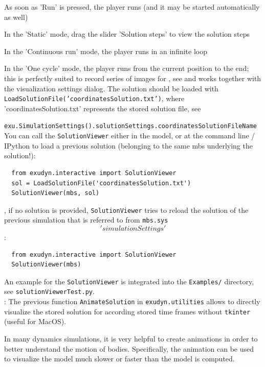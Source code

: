 \item As soon as 'Run' is pressed, the player runs (and it may be started automatically as well)
\item In the 'Static' mode, drag the slider 'Solution steps' to view the solution steps
\item In the 'Continuous run' mode, the player runs in an infinite loop
\item In the 'One cycle' mode, the player runs from the current position to the end; this is perfectly suited to record series of images for , see  and works together with the visualization settings dialog.
\ei
The solution should be loaded with
\texttt{LoadSolutionFile('coordinatesSolution.txt')}, where 'coordinatesSolution.txt' represents the stored solution file, 
see 
\bi
  \item \texttt{exu.SimulationSettings().solutionSettings.coordinatesSolutionFileName}
\ei
You can call the \texttt{SolutionViewer} either in the model, or at the command line / IPython to load a previous solution (belonging to the same mbs underlying the solution!):
\pythonstyle\begin{lstlisting}
  from exudyn.interactive import SolutionViewer
  sol = LoadSolutionFile('coordinatesSolution.txt')
  SolutionViewer(mbs, sol)
\end{lstlisting}
%
, if no solution is provided, \texttt{SolutionViewer} tries to reload the solution of the previous simulation 
that is referred to from \texttt{mbs.sys\['simulationSettings'\]}:
\pythonstyle\begin{lstlisting}
  from exudyn.interactive import SolutionViewer
  SolutionViewer(mbs)
\end{lstlisting}
An example for the \texttt{SolutionViewer} is integrated into the \texttt{Examples/} directory, see \texttt{solutionViewerTest.py}. \\
: The previous function \texttt{AnimateSolution} in \texttt{exudyn.utilities} allows to directly visualize the stored solution for according stored time frames without \texttt{tkinter} (useful for MacOS).

%
In many dynamics simulations, it is very helpful to create animations in order to better understand the motion of bodies. Specifically, the animation can be used to visualize the model much slower or faster than the model is computed.

